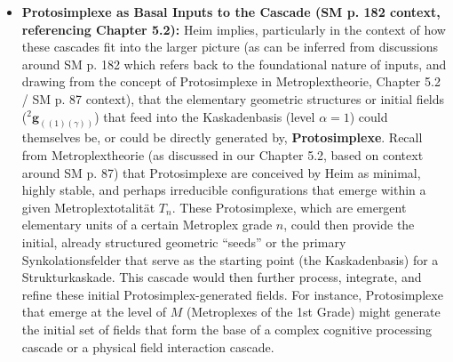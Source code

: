 \documentclass[12pt]{article}
\newcommand{\q}[1]{\enquote{#1}}
\def\metroplex#1#2{M}%
\newcommand{\hypersyntrix}{\metroplex{1}{F}}
\newcommand{\metroplextotalitaet}[1]{T_{#1}}
\newcommand{\partialstruktur}[1]{{}^2\mathbf{g}_{(#1)}}
\newcommand{\kaskadenstufe}{\alpha}
\begin{document}
\begin{itemize}
    \item \textbf{Protosimplexe as Basal Inputs to the Cascade (SM p. 182 context, referencing Chapter 5.2):}
    Heim implies, particularly in the context of how these cascades fit into the larger picture (as can be inferred from discussions around SM p. 182 which refers back to the foundational nature of inputs, and drawing from the concept of Protosimplexe in Metroplextheorie, Chapter 5.2 / SM p. 87 context), that the elementary geometric structures or initial fields (\( \partialstruktur{(1)(\gamma)} \)) that feed into the Kaskadenbasis (level \( \kaskadenstufe=1 \)) could themselves be, or could be directly generated by, \textbf{Protosimplexe}. Recall from Metroplextheorie (as discussed in our Chapter 5.2, based on context around SM p. 87) that Protosimplexe are conceived by Heim as minimal, highly stable, and perhaps irreducible configurations that emerge within a given Metroplextotalität \( \metroplextotalitaet{n} \). These Protosimplexe, which are emergent elementary units of a certain Metroplex grade \(n\), could then provide the initial, already structured geometric \q{seeds} or the primary Synkolationsfelder that serve as the starting point (the Kaskadenbasis) for a Strukturkaskade. This cascade would then further process, integrate, and refine these initial Protosimplex-generated fields. For instance, Protosimplexe that emerge at the level of \( \hypersyntrix \) (Metroplexes of the 1st Grade) might generate the initial set of fields that form the base of a complex cognitive processing cascade or a physical field interaction cascade.


\end{itemize}
\end{document}
